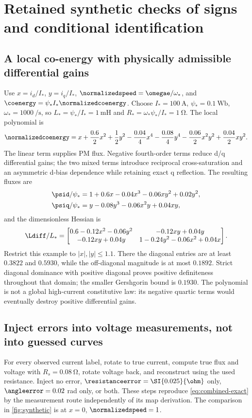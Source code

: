 \section{Retained synthetic checks of signs and conditional identification}
\label{sec:synthetic}
\subsection{A local co-energy with physically admissible differential gains}
Use $x=i_d/I_*$, $y=i_q/I_*$, $\normalizedspeed=\omegae/\omega_*$, and
$\coenergy=\psi_*I_*\normalizedcoenergy$. Choose $I_*=\SI{100}{\ampere}$,
$\psi_*=\SI{0.1}{\weber}$, $\omega_*=\SI{1000}{\per\second}$, so
$L_*=\psi_*/I_*=\SI{1}{\milli\henry}$ and
$R_*=\omega_*\psi_*/I_*=\SI{1}{\ohm}$. The local polynomial is
\begin{equation}
 \normalizedcoenergy=x+\frac{0.6}{2}x^2+\frac12y^2
       -\frac{0.04}{4}x^4-\frac{0.08}{4}y^4
       -\frac{0.06}{2}x^2y^2+\frac{0.04}{2}xy^2.
 \label{eq:synthetic-energy}
\end{equation}
The linear term supplies PM flux. Negative fourth-order terms reduce d/q
differential gains; the two mixed terms introduce reciprocal cross-saturation
and an asymmetric d-bias dependence while retaining exact q reflection.
The resulting fluxes are
\begin{align}
 \psid/\psi_*&=1+0.6x-0.04x^3-0.06xy^2+0.02y^2,\\
 \psiq/\psi_*&=y-0.08y^3-0.06x^2y+0.04xy,
 \label{eq:synthetic-flux}
\end{align}
and the dimensionless Hessian is
\begin{equation}
 \Ldiff/L_*=
 \begin{bmatrix}
 0.6-0.12x^2-0.06y^2&-0.12xy+0.04y\\
 -0.12xy+0.04y&1-0.24y^2-0.06x^2+0.04x
 \end{bmatrix}.\label{eq:synthetic-hessian}
\end{equation}
Restrict this example to $|x|,|y|\leq1.1$. There the diagonal entries are
at least $0.3822$ and $0.5930$, while the off-diagonal magnitude is at most
$0.1892$. Strict diagonal dominance with positive diagonal proves positive
definiteness throughout that domain; the smaller Gershgorin bound is $0.1930$.
The polynomial is not a global high-current constitutive law: its negative
quartic terms would eventually destroy positive differential gains.

\subsection{Inject errors into voltage measurements, not into guessed curves}
For every observed current label, rotate to true current, compute true flux
and voltage with $R_s=\SI{0.08}{\ohm}$, rotate voltage back, and reconstruct
using the used resistance. Inject no error, $\resistanceerror=\SI{0.025}{\ohm}$ only,
$\angleerror=0.02$ rad only, or both. These steps reproduce
\cref{eq:combined-exact} by the measurement route independently of its map
derivation. The comparison in \cref{fig:synthetic} is at $x=0$, $\normalizedspeed=1$.


